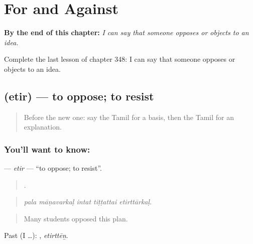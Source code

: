 
\chapter{For and Against}
\label{ch:ta-for-and-against}

\begin{chapteropening}
\textbf{By the end of this chapter:} \emph{I can say that someone opposes or objects to an idea.}

Complete the last lesson of chapter 348: I can say that someone opposes or objects to an idea.
\end{chapteropening}

\section[\texorpdfstring{\ta{எதிர்} (etir)}{எதிர் (etir)}]{ (etir) — to oppose; to resist}

\label{lesson:TA-C348-etir}



\begin{quote}
Before the new one: say the Tamil for a basis, then the Tamil for an explanation.
\end{quote}

\subsection*{You'll want to know: }
\textbf{} — \emph{etir} — \textquotedblleft{}to oppose; to resist\textquotedblright{}.

\begin{quote}
    .
\end{quote}

\begin{quote}
\emph{pala māṇavarkaḷ intat tiṭṭattai etirttārkaḷ.}
\end{quote}

\begin{quote}
Many students opposed this plan.
\end{quote}

Past (I …): , \emph{etirttēṉ}.

